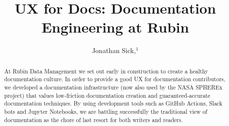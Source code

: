 \documentclass[11pt,twoside]{article}
\begin{document}
\title{UX for Docs: Documentation Engineering at Rubin}

\author{Jonathan Sick,$^1$}





\begin{abstract}
At Rubin Data Management we set out early in construction to create a healthy documentation culture.
In order to provide a good UX for documentation contributors, we developed a documentation infrastructure (now also used by the NASA SPHEREx project) that values low-friction documentation creation and guaranteed-accurate documentation techniques.
By using development tools such as GitHub Actions, Slack bots and Jupyter Notebooks, we are battling successfully the traditional view of documentation as the chore of last resort for both writers and readers.
\end{abstract}

\end{document}
